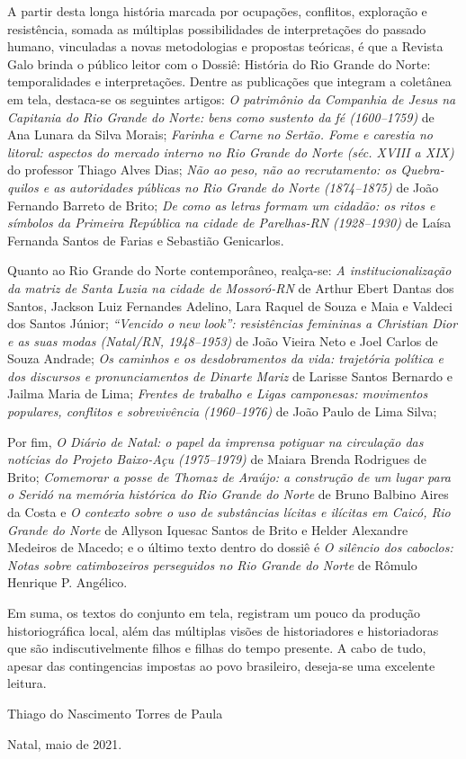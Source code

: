A partir desta longa história marcada por ocupações, conflitos, exploração e resistência, somada as múltiplas possibilidades de interpretações do passado humano, vinculadas a novas metodologias e propostas teóricas, é que a Revista Galo brinda o público leitor com o Dossiê: História do Rio Grande do Norte: temporalidades e interpretações. Dentre as publicações que integram a coletânea em tela, destaca-se os seguintes artigos: \textit{O patrimônio da Companhia de Jesus na Capitania do Rio Grande do Norte: bens como sustento da fé (1600--1759)} de Ana Lunara da Silva Morais; \textit{Farinha e Carne no Sertão. Fome e carestia no litoral: aspectos do mercado interno no Rio Grande do Norte (séc. XVIII a XIX)} do professor Thiago Alves Dias; \textit{Não ao peso, não ao recrutamento: os Quebra-quilos e as autoridades públicas no Rio Grande do Norte (1874--1875)} de João Fernando Barreto de Brito; \textit{De como as letras formam um cidadão: os ritos e símbolos da Primeira República na cidade de Parelhas-RN (1928--1930)} de Laísa Fernanda Santos de Farias e Sebastião Genicarlos.

Quanto ao Rio Grande do Norte contemporâneo, realça-se: \textit{A institucionalização da matriz de Santa Luzia na cidade de Mossoró-RN} de Arthur Ebert Dantas dos Santos, Jackson Luiz Fernandes Adelino, Lara Raquel de Souza e Maia e Valdeci dos Santos Júnior; \textit{“Vencido o \emph{new look}”: resistências femininas a Christian Dior e as suas modas (Natal/RN, 1948--1953)} de João Vieira Neto e Joel Carlos de Souza Andrade; \textit{Os caminhos e os desdobramentos da vida: trajetória política e dos discursos e pronunciamentos de Dinarte Mariz} de Larisse Santos Bernardo e Jailma Maria de Lima; \textit{Frentes de trabalho e Ligas camponesas: movimentos populares, conflitos e sobrevivência (1960--1976)} de João Paulo de Lima Silva;  

Por fim, \textit{O Diário de Natal: o papel da imprensa potiguar na circulação das notícias do Projeto Baixo-Açu (1975--1979)} de Maiara Brenda Rodrigues de Brito; \textit{Comemorar a posse de Thomaz de Araújo: a construção de um lugar para o \emph{Seridó} na memória histórica do Rio Grande do Norte} de Bruno Balbino Aires da Costa e \textit{O contexto sobre o uso de substâncias lícitas e ilícitas em Caicó, Rio Grande do Norte} de Allyson Iquesac Santos de Brito e Helder Alexandre Medeiros de Macedo; e o último texto dentro do dossiê é \textit{O silêncio dos caboclos: Notas sobre catimbozeiros perseguidos no Rio Grande do Norte} de Rômulo Henrique P. Angélico. 

Em suma, os textos do conjunto em tela, registram um pouco da produção historiográfica local, além das múltiplas visões de historiadores e historiadoras que são indiscutivelmente filhos e filhas do tempo presente. A cabo de tudo, apesar das contingencias impostas ao povo brasileiro, deseja-se uma excelente leitura.

\bigskip

Thiago do Nascimento Torres de Paula

\bigskip

\hfill Natal, maio de 2021.
